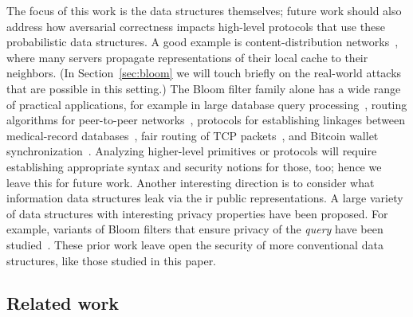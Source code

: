 %
The focus of this work is the data structures themselves; future work should
also address how aversarial correctness impacts high-level protocols that use
these probabilistic data structures. A good example is content-distribution
networks~\cite{byers2002informed}, where many servers propagate representations
of their local cache to their neighbors. (In Section~\ref{sec:bloom} we will
touch briefly on the real-world attacks that are possible in this setting.) The
Bloom filter family alone has a wide range of practical applications, for
example in large database query processing~\cite{broder2004network}, routing
algorithms for peer-to-peer networks~\cite{reynolds2003efficient}, protocols for
establishing linkages between medical-record databases~\cite{schnell2011novel},
fair routing of TCP packets~\cite{feng2001stochastic}, and Bitcoin wallet
synchronization~\cite{gervais2014privacy}.
%
Analyzing higher-level primitives or protocols will require establishing
appropriate syntax and security notions for those, too; hence we leave this for
future work.
%
Another interesting direction is to consider what information data structures
leak via the ir public representations. A large variety of data structures with
interesting privacy properties have been proposed. For example, variants of
Bloom filters that ensure privacy of the \emph{query} have been
studied~\cite{bellovin2004privacy,nojima2009cryptographically}. These prior work
leave open the security of more conventional data structures, like those studied
in this paper.

\subsection{Related work}



